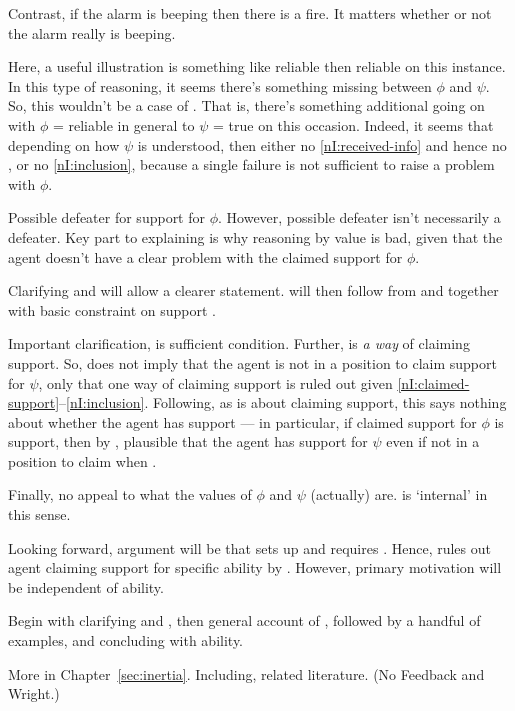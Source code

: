 \begin{note}[~\ref{nI:going-by-value}]
  Contrast, if the alarm is beeping then there is a fire.
  It matters whether or not the alarm really is beeping.

  Here, a useful illustration is something like reliable then reliable on this instance.
  In this type of reasoning, it seems there's something missing between \(\phi\) and \(\psi\).
  So, this wouldn't be a case of \RBV{}.
  That is, there's something additional going on with \(\phi\) = reliable in general to \(\psi\) = true on this occasion.
  Indeed, it seems that depending on how \(\psi\) is understood, then either no \ref{nI:received-info} and hence no \RBV{}, or no \ref{nI:inclusion}, because a single failure is not sufficient to raise a problem with \(\phi\).
\end{note}

\newpage

\begin{note}


  Possible defeater for support for \(\phi\).
  However, possible defeater isn't necessarily a defeater.
  Key part to explaining \nI{} is why reasoning by value is bad, given that the agent doesn't have a clear problem with the claimed support for \(\phi\).

  Clarifying \incl{} and \RBV{} will allow a clearer statement.
  \nI{} will then follow from \incl{} and \RBV{} together with basic constraint on support \eiS{}.

  Important clarification, \nI{} is sufficient condition.
  Further, \RBV{} is \emph{a way} of claiming support.
  So, \nI{} does not imply that the agent is not in a position to claim support for \(\psi\), only that one way of claiming support is ruled out given \ref{nI:claimed-support}--\ref{nI:inclusion}.
  Following, as \nI{} is about claiming support, this says nothing about whether the agent has support --- in particular, if claimed support for \(\phi\) is support, then by \incl{}, plausible that the agent has support for \(\psi\) even if not in a position to claim when \RBV{}.

  Finally, no appeal to what the values of \(\phi\) and \(\psi\) (actually) are.
  \nI{} is `internal' in this sense.

  Looking forward, argument will be that \gsi{} sets up \incl{} and \AR{} requires \RBV{}.
  Hence, \nI{} rules out agent claiming support for specific ability by \AR{}.
  However, primary motivation will be independent of ability.

  Begin with clarifying \incl{} and \RBV{}, then general account of \nI{}, followed by a handful of examples, and concluding with ability.

  More in Chapter~\ref{sec:inertia}.
  Including, related literature. (No Feedback and Wright.)
\end{note}



